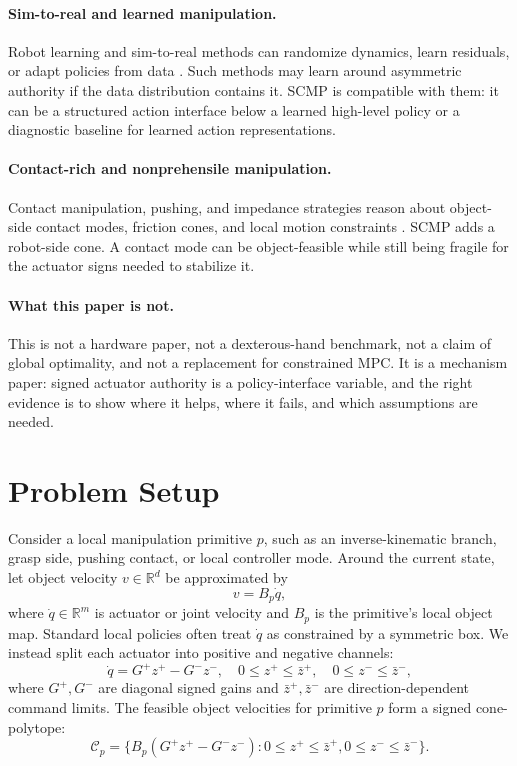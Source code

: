 \documentclass{article}
\newcommand{\R}{\mathbb{R}}
\begin{document}
\paragraph{Sim-to-real and learned manipulation.}
Robot learning and sim-to-real methods can randomize dynamics, learn residuals, or adapt policies from data \citep{simreal,randomization,learning,residual}. Such methods may learn around asymmetric authority if the data distribution contains it. SCMP is compatible with them: it can be a structured action interface below a learned high-level policy or a diagnostic baseline for learned action representations.

\paragraph{Contact-rich and nonprehensile manipulation.}
Contact manipulation, pushing, and impedance strategies reason about object-side contact modes, friction cones, and local motion constraints \citep{pushing,contact,impedance}. SCMP adds a robot-side cone. A contact mode can be object-feasible while still being fragile for the actuator signs needed to stabilize it.

\paragraph{What this paper is not.}
This is not a hardware paper, not a dexterous-hand benchmark, not a claim of global optimality, and not a replacement for constrained MPC. It is a mechanism paper: signed actuator authority is a policy-interface variable, and the right evidence is to show where it helps, where it fails, and which assumptions are needed.

\section{Problem Setup}

Consider a local manipulation primitive $p$, such as an inverse-kinematic branch, grasp side, pushing contact, or local controller mode. Around the current state, let object velocity $v\in\R^d$ be approximated by
\begin{equation}
v = B_p \dot q,
\end{equation}
where $\dot q\in\R^m$ is actuator or joint velocity and $B_p$ is the primitive's local object map. Standard local policies often treat $\dot q$ as constrained by a symmetric box. We instead split each actuator into positive and negative channels:
\begin{equation}
\dot q = G^+z^+ - G^-z^-,
\quad
0\le z^+\le \bar z^+,\quad
0\le z^-\le \bar z^-,
\end{equation}
where $G^+,G^-$ are diagonal signed gains and $\bar z^+,\bar z^-$ are direction-dependent command limits. The feasible object velocities for primitive $p$ form a signed cone-polytope:
\begin{equation}
\mathcal{C}_p = \{B_p(G^+z^+-G^-z^-):0\le z^+\le \bar z^+,0\le z^-\le \bar z^-\}.
\end{equation}
\end{document}
